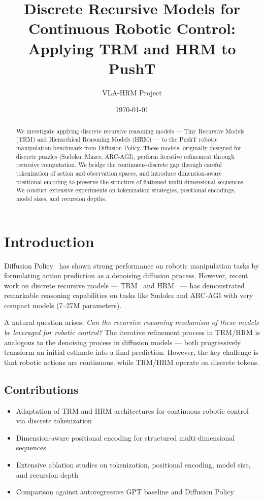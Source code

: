 \documentclass[11pt,a4paper]{article}
\title{Discrete Recursive Models for Continuous Robotic Control:\\
Applying TRM and HRM to PushT}
\author{VLA-HRM Project}
\date{\today}
\begin{document}
\maketitle

\begin{abstract}
We investigate applying discrete recursive reasoning models --- Tiny Recursive Models (TRM) and Hierarchical Reasoning Models (HRM) --- to the PushT robotic manipulation benchmark from Diffusion Policy. These models, originally designed for discrete puzzles (Sudoku, Mazes, ARC-AGI), perform iterative refinement through recursive computation. We bridge the continuous-discrete gap through careful tokenization of action and observation spaces, and introduce dimension-aware positional encoding to preserve the structure of flattened multi-dimensional sequences. We conduct extensive experiments on tokenization strategies, positional encodings, model sizes, and recursion depths.
\end{abstract}

\section{Introduction}

Diffusion Policy~\cite{chi2023diffusion} has shown strong performance on robotic manipulation tasks by formulating action prediction as a denoising diffusion process. However, recent work on discrete recursive models --- TRM~\cite{trm2024} and HRM~\cite{hrm2024} --- has demonstrated remarkable reasoning capabilities on tasks like Sudoku and ARC-AGI with very compact models (7--27M parameters).

A natural question arises: \textit{Can the recursive reasoning mechanism of these models be leveraged for robotic control?} The iterative refinement process in TRM/HRM is analogous to the denoising process in diffusion models --- both progressively transform an initial estimate into a final prediction. However, the key challenge is that robotic actions are continuous, while TRM/HRM operate on discrete tokens.

\subsection{Contributions}
\begin{itemize}[noitemsep]
    \item Adaptation of TRM and HRM architectures for continuous robotic control via discrete tokenization
    \item Dimension-aware positional encoding for structured multi-dimensional sequences
    \item Extensive ablation studies on tokenization, positional encoding, model size, and recursion depth
    \item Comparison against autoregressive GPT baseline and Diffusion Policy
\end{itemize}
\end{document}
